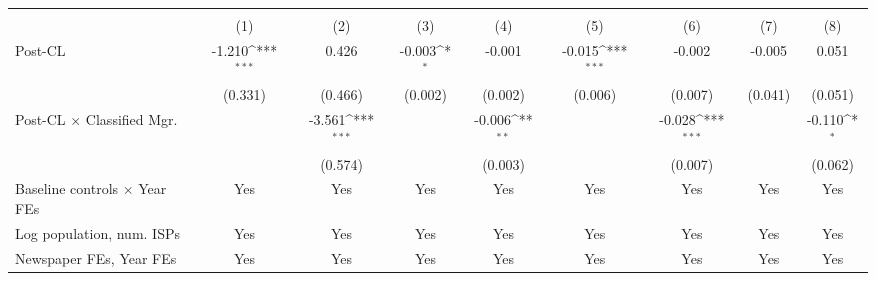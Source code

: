 {
\def\sym#1{\ifmmode^{#1}\else\(^{#1}\)\fi}
\begin{tabular}{l*{8}{c}}
\toprule
                    &&&&\\\cmidrule(lr){2-3}\cmidrule(lr){4-5}\cmidrule(lr){6-7}\cmidrule(lr){8-9}
                    &         &         &         &         &         &         &         &         \\
\midrule
Post-CL             &      -1.210\sym{***}&       0.426         &      -0.003\sym{*}  &      -0.001         &      -0.015\sym{***}&      -0.002         &      -0.005         &       0.051         \\
                    &     (0.331)         &     (0.466)         &     (0.002)         &     (0.002)         &     (0.006)         &     (0.007)         &     (0.041)         &     (0.051)         \\
\addlinespace
Post-CL $\times$ Classified Mgr.&                     &      -3.561\sym{***}&                     &      -0.006\sym{**} &                     &      -0.028\sym{***}&                     &      -0.110\sym{*}  \\
                    &                     &     (0.574)         &                     &     (0.003)         &                     &     (0.007)         &                     &     (0.062)         \\
\addlinespace
Baseline controls $\times$ Year FEs &         Yes         &         Yes         &         Yes         &         Yes         &         Yes         &         Yes         &         Yes         &         Yes         \\
\addlinespace
Log population, num. ISPs &         Yes         &         Yes         &         Yes         &         Yes         &         Yes         &         Yes         &         Yes         &         Yes         \\
\addlinespace
Newspaper FEs, Year FEs &         Yes         &         Yes         &         Yes         &         Yes         &         Yes         &         Yes         &         Yes         &         Yes         \\

\end{tabular}}
